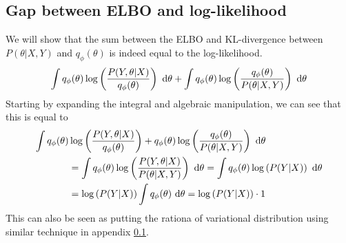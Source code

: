 \subsection{Gap between ELBO and log-likelihood}
\label{appx:chap2-elbo-gap}
We will show that the sum between the ELBO and KL-divergence between $P(\theta | X, Y)$ and $q_{\phi}(\theta)$ is indeed equal to the log-likelihood.
\begin{equation*}
    \int q_{\phi}(\theta) \log\left(\frac{P(Y, \theta | X)}{q_{\phi}(\theta)}\right) \ \mathrm{d} \theta + \int q_{\phi} (\theta) \log\left( \frac{q_{\phi} (\theta)}{P(\theta | X, Y)} \right) \ \mathrm{d} \theta
\end{equation*}
Starting by expanding the integral and algebraic manipulation, we can see that this is equal to \begin{equation*}
    \begin{aligned}
        \int q_{\phi}(\theta) &\log\left(\frac{P(Y, \theta | X)}{q_{\phi}(\theta)}\right) +  q_{\phi} (\theta) \log\left( \frac{q_{\phi} (\theta)}{P(\theta | X, Y)} \right) \ \mathrm{d} \theta   \\ 
        &= \int q_{\phi}(\theta) \log\left( \frac{P(Y, \theta | X)}{P(\theta | X, Y)} \right) \ \mathrm{d} \theta = \int q_{\phi}(\theta) \log\left( P(Y | X) \right) \ \mathrm{d} \theta \\
        &= \log\left( P(Y | X) \right) \int q_{\phi}(\theta) \ \mathrm{d} \theta = \log\left( P(Y | X) \right) \cdot 1
    \end{aligned}
\end{equation*}
This can also be seen as putting the rationa of variational distribution using similar technique in appendix \ref{appx:chap2-elbo-gap}.